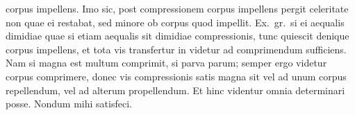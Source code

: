 corpus impellens.\protect{}
\pend 
%
\pstart
Imo sic, post compressionem\protect{} corpus impellens\protect{}
pergit celeritate non quae ei restabat, sed minore ob corpus quod impellit.
Ex.~gr.\ si ei aequalis dimidiae 
%
%
quae si etiam aequalis
sit dimidiae compressionis,\protect{} tunc quiescit denique corpus impellens\protect{}, et
tota vis transfertur\protect{} in 
%
%
videtur 
%
%
ad comprimendum sufficiens. Nam si magna est multum comprimit, si parva
parum; semper ergo videtur corpus comprimere, donec vis compressionis\protect{} 
satis magna sit vel ad unum corpus repellendum, vel ad alterum 
propellendum. Et hinc videntur omnia determinari posse.
\pend \pstart
Nondum mihi satisfeci.
\pend
\count{}%
\count{}%
\count{}
